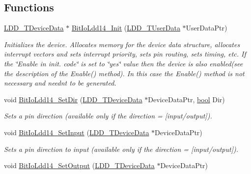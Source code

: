 \subsection*{Functions}
\begin{DoxyCompactItemize}
\item 
\hyperlink{group___p_e___types__module_gac5cf1362f1f0e3a2ce71b1bf2276d091}{L\+D\+D\+\_\+\+T\+Device\+Data} $\ast$ \hyperlink{group___bit_io_ldd14__module_ga4f0f63657193f71b93f7ccc9aa4f5a86}{Bit\+Io\+Ldd14\+\_\+\+Init} (\hyperlink{group___p_e___types__module_ga0b66a73f87238a782318aa0be7578e35}{L\+D\+D\+\_\+\+T\+User\+Data} $\ast$User\+Data\+Ptr)
\begin{DoxyCompactList}\small\item\em Initializes the device. Allocates memory for the device data structure, allocates interrupt vectors and sets interrupt priority, sets pin routing, sets timing, etc. If the \char`\"{}\+Enable
    in init. code\char`\"{} is set to \char`\"{}yes\char`\"{} value then the device is also enabled(see the description of the Enable() method). In this case the Enable() method is not necessary and needn\textquotesingle{}t to be generated. \end{DoxyCompactList}\item 
void \hyperlink{group___bit_io_ldd14__module_ga355321bc14f2b7d48f987262e47ec774}{Bit\+Io\+Ldd14\+\_\+\+Set\+Dir} (\hyperlink{group___p_e___types__module_gac5cf1362f1f0e3a2ce71b1bf2276d091}{L\+D\+D\+\_\+\+T\+Device\+Data} $\ast$Device\+Data\+Ptr, \hyperlink{group___p_e___types__module_ga97a80ca1602ebf2303258971a2c938e2}{bool} Dir)
\begin{DoxyCompactList}\small\item\em Sets a pin direction (available only if the direction = {\itshape \mbox{[}input/output\mbox{]}}). \end{DoxyCompactList}\item 
void \hyperlink{group___bit_io_ldd14__module_gaa57898006e1c42d880e2a66dbcaecae7}{Bit\+Io\+Ldd14\+\_\+\+Set\+Input} (\hyperlink{group___p_e___types__module_gac5cf1362f1f0e3a2ce71b1bf2276d091}{L\+D\+D\+\_\+\+T\+Device\+Data} $\ast$Device\+Data\+Ptr)
\begin{DoxyCompactList}\small\item\em Sets a pin direction to input (available only if the direction = {\itshape \mbox{[}input/output\mbox{]}}). \end{DoxyCompactList}\item 
void \hyperlink{group___bit_io_ldd14__module_ga92faf92eda5aee7a1ee9aae450d3b062}{Bit\+Io\+Ldd14\+\_\+\+Set\+Output} (\hyperlink{group___p_e___types__module_gac5cf1362f1f0e3a2ce71b1bf2276d091}{L\+D\+D\+\_\+\+T\+Device\+Data} $\ast$Device\+Data\+Ptr)

\end{DoxyCompactItemize}
